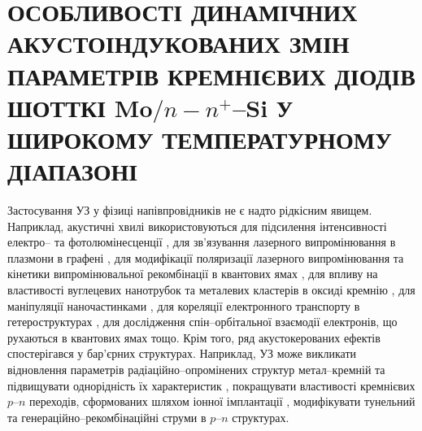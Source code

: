 \chapter{\MakeUppercase{Особливості динамічних акустоіндукованих змін параметрів
кремнієвих діодів Шотткі} Mo$/n-n^+$--Si \MakeUppercase{у широкому температурному діапазоні}\label{Ch_USL_T_SD}}

Застосування УЗ у фізиці напівпровідників не є надто рідкісним явищем.
Наприклад, акустичні хвилі використовуються для підсилення інтенсивності
електро-- \cite{Wang:JLum} та фотолюмінесценції \cite{Bahar2003,ZobovFTP2008},
для зв'язування лазерного випромінювання в плазмони в графені \cite{Schiefele:2011},
для модифікації поляризації лазерного випромінювання \cite{Kulakova:2012SSC} та
кінетики випромінювальної рекомбінації в квантових ямах \cite{Ostrovskii2001},
для впливу на властивості вуглецевих нанотрубок \cite{Pandey:2014}
та металевих кластерів в оксиді кремнію \cite{Roman:2006JAP,Roman:2007APL},
для маніпуляції наночастинками \cite{Bart:2011},
для кореляції електронного транспорту в гетероструктурах \cite{Buyukkose:2013,He:2010},
для дослідження спін--орбітальної взаємодії електронів, що рухаються в квантових ямах \cite{Sanada:2011} тощо.
Крім того, ряд акустокерованих ефектів спостерігався у бар'єрних структурах.
Наприклад, УЗ може викликати відновлення параметрів радіаційно--опромінених \cite{Gorb2010} структур метал--кремній та підвищувати
однорідність їх характеристик \cite{Olikh:PZTF2006},
покращувати властивості кремнієвих $p$--$n$ переходів, сформованих шляхом іонної імплантації \cite{YOlikh2005},
модифікувати тунельний \cite{Teterkin2009r} та генераційно--рекомбінаційні \cite{Davletova2009,Davletova2008} струми в $p$--$n$ структурах.

